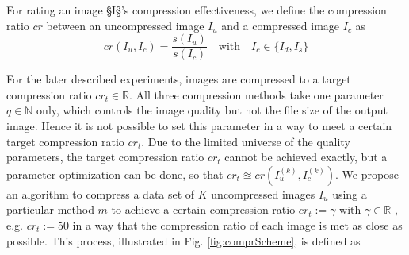 \documentclass[10pt,twocolumn,letterpaper]{article}
\begin{document}

For rating an image §I§'s compression effectiveness, we define the compression ratio $cr$ between an uncompressed image $I_u$ and a compressed image $I_c$ as 
\begin{equation}
cr(I_u, I_c) = \frac{s(I_u)}{s(I_c)} \quad \text{with} \quad I_c \in \{I_d, I_s\}
\end{equation}

For the later described experiments, images are compressed to a target compression ratio $cr_t \in \mathbb{R}$. All three compression methods take one parameter $q \in \mathbb{N}$ only, which controls the image quality but not the file size of the output image. Hence it is not possible to set this parameter in a way to meet a certain target compression ratio $cr_t$. Due to the limited universe of the quality parameters, the target compression ratio $cr_t$ cannot be achieved exactly, but a parameter optimization can be done, so that $cr_t \approxeq cr(I_u^{(k)}, I_c^{(k)})$. We propose an algorithm to compress a data set of $K$ uncompressed images $I_u$ using a particular method $m$ to achieve a certain compression ratio $cr_t := \gamma$ with $\gamma \in \mathbb{R}$ , e.g. $cr_t := 50$ in a way that the compression ratio of each image is met as close as possible. This process, illustrated in Fig. \ref{fig:comprScheme}, is defined as
\end{document}
